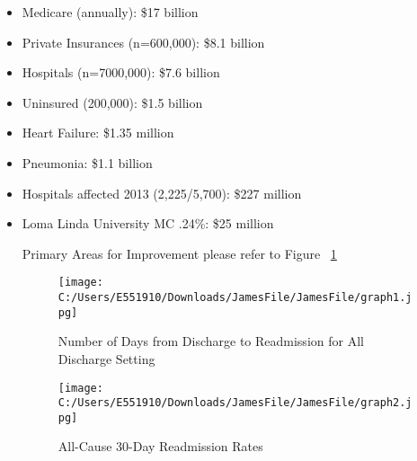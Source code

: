 \documentclass[11pt]{article}\usepackage[]{graphicx}\usepackage[]{color}
\begin{document}
\begin{itemize}

\item	Medicare (annually):				\$17 billion
\item	Private Insurances (n=600,000): 		\$8.1 billion
\item	Hospitals (n=7000,000): 			\$7.6 billion
\item	Uninsured (200,000): 	                  		\$1.5 billion
\item		Heart Failure:	                   			\$1.35 million
\item		Pneumonia:    					\$1.1 billion
\item	Hospitals affected 2013 (2,225/5,700):	\$227 million
\item		Loma Linda University MC .24\%: 		\$25 million
\begin{itemize}
Primary Areas for Improvement please refer to Figure ~\ref{fig:FirstGraph}


\begin{figure}[ht!]
    \centering
    \texttt{[image: C:/Users/E551910/Downloads/JamesFile/JamesFile/graph1.jpg]}
    \caption{Number of Days from Discharge to Readmission for All Discharge Setting}
    \label{fig:FirstGraph}
\end{figure}

\newpage
\clearpage

\begin{figure}[t]  %
    \centering
    \texttt{[image: C:/Users/E551910/Downloads/JamesFile/JamesFile/graph2.jpg]}
    \caption{All-Cause 30-Day Readmission Rates}
    \label{fig:AllCause30DaysAdminRate}
\end{figure}


\clearpage
\newpage
\begin{landscape}


\end{landscape}
\end{itemize}
\end{itemize}
\end{document}
